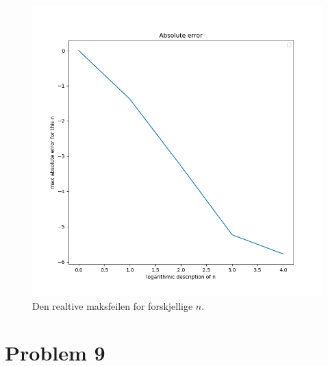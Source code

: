 \documentclass[english,notitlepage]{revtex4-1}  %
\begin{document}
\begin{figure}
\centering
\includegraphics[scale=0.5]{Images/relerr.png}
\caption{Den realtive maksfeilen for forskjellige $n$.}
\label{relerr}
\end{figure}


\section*{Problem 9}
\end{document}
